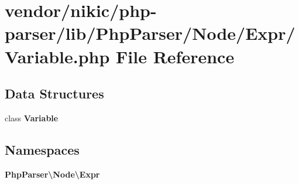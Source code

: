 \section{vendor/nikic/php-\/parser/lib/\+Php\+Parser/\+Node/\+Expr/\+Variable.php File Reference}
\label{_variable_8php}
\subsection*{Data Structures}
\begin{DoxyCompactItemize}
\item 
class {\bf Variable}
\end{DoxyCompactItemize}
\subsection*{Namespaces}
\begin{DoxyCompactItemize}
\item 
 {\bf Php\+Parser\textbackslash{}\+Node\textbackslash{}\+Expr}
\end{DoxyCompactItemize}
